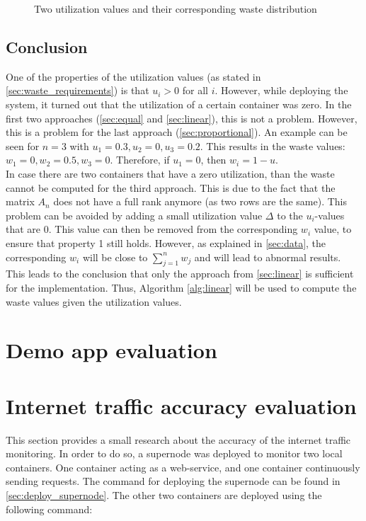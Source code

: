 \begin{figure}
{        \label{fig:approaches:B}%
    }
    \caption{Two utilization values and their corresponding waste distribution}
    \label{fig:approaches}
\end{figure}


\subsection{Conclusion} \label{sec:conclusion4}
One of the properties of the utilization values (as stated in \autoref{sec:waste_requirements}) is that $u_i > 0$ for all $i$. However, while deploying the system, it turned out that the utilization of a certain container was zero. In the first two approaches (\autoref{sec:equal} and \autoref{sec:linear}), this is not a problem. However, this is a problem for the last approach (\autoref{sec:proportional}). An example can be seen for $n = 3$ with $u_1 = 0.3, u_2 = 0, u_3 = 0.2$. This results in the waste values: $w_1 = 0, w_2 = 0.5, w_3 = 0$. Therefore, if $u_1 = 0$, then $w_i = 1 - u$.\\

\noindent
In case there are two containers that have a zero utilization, than the waste cannot be computed for the third approach. This is due to the fact that the matrix $A_n$ does not have a full rank anymore (as two rows are the same). This problem can be avoided by adding a small utilization value $\Delta$ to the $u_i$-values that are $0$. This value can then be removed from the corresponding $w_i$ value, to ensure that property 1 still holds. However, as explained in \autoref{sec:data}, the corresponding $w_i$ will be close to $\sum_{j=1}^n w_j$ and will lead to abnormal results. This leads to the conclusion that only the approach from \autoref{sec:linear} is sufficient for the implementation. Thus, Algorithm \ref{alg:linear} will be used to compute the waste values given the utilization values.


\section{Demo app evaluation} \label{sec:demo_eval}

\section{Internet traffic accuracy evaluation} \label{sec:eval_k}
This section provides a small research about the accuracy of the internet traffic monitoring. In order to do so, a supernode was deployed to monitor two local containers. One container acting as a web-service, and one container continuously sending requests. The command for deploying the supernode can be found in \autoref{sec:deploy_supernode}. The other two containers are deployed using the following command:

